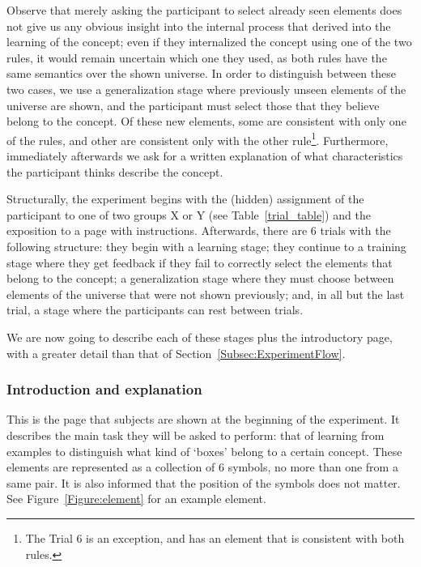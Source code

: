 Observe that merely asking the participant to select already seen elements does not give us any obvious insight into the internal process that derived into the learning of the concept; even if they internalized the concept using one of the two rules, it would remain uncertain which one they used, as both rules have the same semantics over the shown universe. %
In order to distinguish between these two cases, we use a generalization stage where previously unseen elements of the universe are shown, and the participant must select those that they believe belong to the concept. Of these new elements, some are consistent with only one of the rules, and other are consistent only with the other rule\footnote{The Trial 6 is an exception, and has an element that is consistent with both rules.}. Furthermore, immediately afterwards we ask for a written explanation of what characteristics the participant thinks describe the  concept.

Structurally, the experiment begins with the (hidden) assignment of the participant to one of two groups X or Y (see Table~\ref{trial_table}) and the exposition to a page with instructions. 
Afterwards, there are 6 trials with the following structure: they begin with a learning stage; they continue to a training stage where they get feedback if they fail to correctly select the elements that belong to the concept; a generalization stage where they must choose between elements of the universe that were not shown previously; and, in all but the last trial, a stage where the participants can rest between trials.


We are now going to describe each of these stages plus the introductory page, with a greater detail than that of Section~\ref{Subsec:ExperimentFlow}.

\subsubsection{Introduction and explanation}
This is the page that subjects are shown at the beginning of the experiment. It describes the main task they will be asked to perform: that of learning from examples to distinguish what kind of `boxes' belong to a certain concept. These elements are represented as a collection of 6 symbols, no more than one from a same pair. It is also informed that the position of the symbols does not matter. See Figure~\ref{Figure:element} for an example element.

